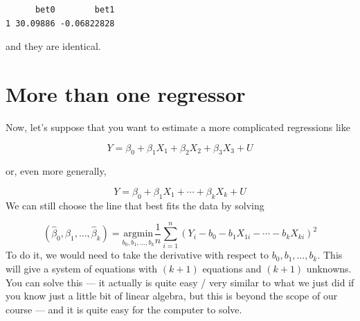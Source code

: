 \documentclass[
  letterpaper,
  DIV=11,
  numbers=noendperiod]{scrreprt}
\newenvironment{Shaded}{\begin{snugshade}}{\end{snugshade}}
\newcommand{\AttributeTok}[1]{\textcolor[rgb]{0.40,0.45,0.13}{#1}}
\newcommand{\CommentTok}[1]{\textcolor[rgb]{0.37,0.37,0.37}{#1}}
\newcommand{\FunctionTok}[1]{\textcolor[rgb]{0.28,0.35,0.67}{#1}}
\newcommand{\NormalTok}[1]{\textcolor[rgb]{0.00,0.23,0.31}{#1}}
\newcommand{\OtherTok}[1]{\textcolor[rgb]{0.00,0.23,0.31}{#1}}
\newcommand{\SpecialCharTok}[1]{\textcolor[rgb]{0.37,0.37,0.37}{#1}}
\begin{document}
\begin{Shaded}
\end{Shaded}

\begin{verbatim}
      bet0        bet1
1 30.09886 -0.06822828
\end{verbatim}

and they are identical.

\section{More than one regressor}\label{more-than-one-regressor}

Now, let's suppose that you want to estimate a more complicated
regressions like

\[
  Y = \beta_0 + \beta_1 X_1 + \beta_2 X_2 + \beta_3 X_3 + U
\]

or, even more generally,

\[
  Y = \beta_0 + \beta_1 X_1 + \cdots + \beta_k X_k + U
\] We can still choose the line that best fits the data by solving

\[
  (\hat{\beta}_0, \hat{\beta}_1, \ldots, \hat{\beta}_k) = \underset{b_0,b_1,\ldots,b_k}{\textrm{argmin}} \frac{1}{n} \sum_{i=1}^n (Y_i - b_0 - b_1 X_{1i} - \cdots - b_k X_{ki})^2
\] To do it, we would need to take the derivative with respect to
\(b_0, b_1, \ldots, b_k\). This will give a system of equations with
\((k+1)\) equations and \((k+1)\) unknowns. You can solve this --- it
actually is quite easy / very similar to what we just did if you know
just a little bit of linear algebra, but this is beyond the scope of our
course --- and it is quite easy for the computer to solve.
\end{document}
